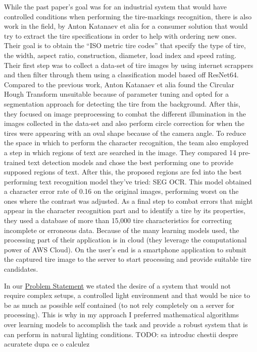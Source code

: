 While the past paper's goal was for an industrial system that would have controlled conditions when performing the tire-markings recognition, there is also work in the field, by Anton Katanaev et alia \cite{site:0} for a consumer solution that would try to extract the tire specifications in order to help with ordering new ones. Their goal is to obtain the “ISO metric tire codes” that specify the type of tire, the width, aspect ratio, construction, diameter, load index and speed rating. Their first step was to collect a data-set of tire images by using internet scrappers and then filter through them using a classification model based off ResNet64. Compared to the previous work, Anton Katanaev et alia found the Circular Hough Transform unsuitable because of parameter tuning and opted for a segmentation approach for detecting the tire from the background. After this, they focused on image preprocessing to combat the different illumination in the images collected in the data-set and also perform circle correction for when the tires were appearing with an oval shape because of the camera angle. To reduce the space in which to perform the character recognition, the team also employed a step in which regions of text are searched in the image. They compared 14 pre-trained text detection models and chose the best performing one to provide supposed regions of text. After this, the proposed regions are fed into the best performing text recognition model they've tried: SEG OCR. This model obtained a character error rate of 0.16 on the original images, performing worst on the ones where the contrast was adjusted. As a final step to combat errors that might appear in the character recognition part and to identify a tire by its properties, they used a database of more than 15,000 tire characteristics for correcting incomplete or erroneous data. Because of the many learning models used, the processing part of their application is in cloud (they leverage the computational power of AWS Cloud). On the user's end is a smartphone application to submit the captured tire image to the server to start processing and provide suitable tire candidates.

In our \hyperref[sec:problem-statement]{Problem Statement} we stated the desire of a system that would not require complex setups, a controlled light environment and that would be nice to be as much as possible self contained (to not rely completely on a server for processing). This is why in my approach I preferred mathematical algorithms over learning models to accomplish the task and provide a robust system that is can perform in natural lighting conditions. TODO: sa introduc chestii despre acuratete dupa ce o calculez